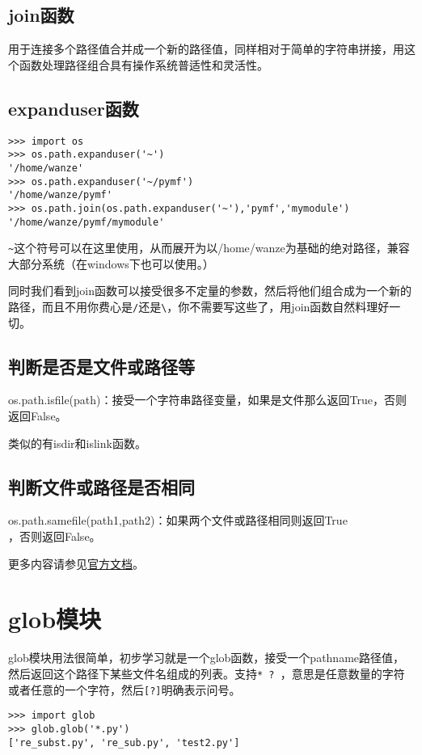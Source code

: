 \documentclass[12pt,oneside]{book}
\begin{document}
\begin{common-format}
\section{join函数}
用于连接多个路径值合并成一个新的路径值，同样相对于简单的字符串拼接，用这个函数处理路径组合具有操作系统普适性和灵活性。



\section{expanduser函数}
\begin{Verbatim}
>>> import os
>>> os.path.expanduser('~')
'/home/wanze'
>>> os.path.expanduser('~/pymf')
'/home/wanze/pymf'
>>> os.path.join(os.path.expanduser('~'),'pymf','mymodule')
'/home/wanze/pymf/mymodule'
\end{Verbatim}

\verb+~+这个符号可以在这里使用，从而展开为以/home/wanze为基础的绝对路径，兼容大部分系统（在windows下也可以使用。）

同时我们看到join函数可以接受很多不定量的参数，然后将他们组合成为一个新的路径，而且不用你费心是\verb+/+还是\verb+\+，你不需要写这些了，用join函数自然料理好一切。





\section{判断是否是文件或路径等}
os.path.isfile(path)：接受一个字符串路径变量，如果是文件那么返回True，否则返回False。

类似的有isdir和islink函数。

\section{判断文件或路径是否相同}
os.path.samefile(path1,path2)：如果两个文件或路径相同则返回True\\，否则返回False。


\begin{Large}
更多内容请参见\href{https://docs.python.org/3/library/os.path.html}{官方文档}。
\end{Large}


\chapter{glob模块}
glob模块用法很简单，初步学习就是一个glob函数，接受一个pathname路径值，然后返回这个路径下某些文件名组成的列表。支持\verb+* ? +，意思是任意数量的字符或者任意的一个字符，然后\verb+[?]+明确表示问号。
\begin{Verbatim}
>>> import glob
>>> glob.glob('*.py')
['re_subst.py', 're_sub.py', 'test2.py']
\end{Verbatim}





\end{common-format}
\end{document}
